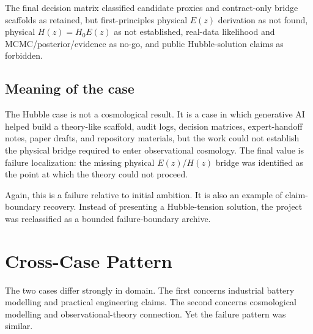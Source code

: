 \documentclass[a4paper,11pt]{article}
\begin{document}
The final decision matrix classified candidate proxies and contract-only bridge scaffolds as retained, but first-principles physical $E(z)$ derivation as not found, physical $H(z)=H_0E(z)$ as not established, real-data likelihood and MCMC/posterior/evidence as no-go, and public Hubble-solution claims as forbidden.

\subsection{Meaning of the case}

The Hubble case is not a cosmological result. It is a case in which generative AI helped build a theory-like scaffold, audit logs, decision matrices, expert-handoff notes, paper drafts, and repository materials, but the work could not establish the physical bridge required to enter observational cosmology. The final value is failure localization: the missing physical $E(z)$/$H(z)$ bridge was identified as the point at which the theory could not proceed.

Again, this is a failure relative to initial ambition. It is also an example of claim-boundary recovery. Instead of presenting a Hubble-tension solution, the project was reclassified as a bounded failure-boundary archive.

\section{Cross-Case Pattern}

The two cases differ strongly in domain. The first concerns industrial battery modelling and practical engineering claims. The second concerns cosmological modelling and observational-theory connection. Yet the failure pattern was similar.
\end{document}
